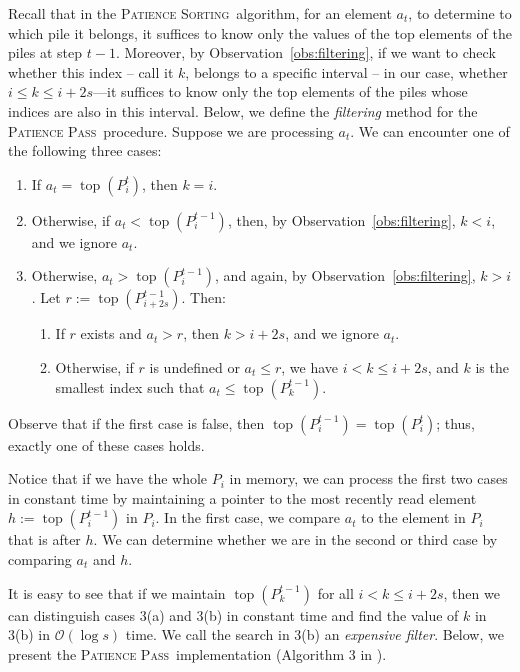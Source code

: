 \documentclass[lic, english, shortabstract]{iithesis}
\theoremstyle{plain}
\newcommand{\Psort}{\textsc{Patience Sorting}}
\newcommand{\Ppass}{\textsc{Patience Pass}}
\theoremstyle{definition}
\begin{document}
Recall that in the \Psort\ algorithm, for an element $a_t$, to determine to which pile it belongs, it suffices to know only the values of the top elements of the piles at step $t-1$. 
Moreover, by Observation~\ref{obs:filtering}, if we want to check whether this index -- call it $k$, belongs to a specific interval -- in our case, whether $i \leq k \leq i + 2s$---it suffices to know only the top elements of the piles whose indices are also in this interval.
Below, we define the \textit{filtering} method for the \Ppass\ procedure.
Suppose we are processing $a_t$. We can encounter one of the following three cases: 
\begin{enumerate}
\item If $a_t = \operatorname{top}(P_i^t)$, then $k = i$.
\item Otherwise, if $a_t < \operatorname{top}(P_i^{t-1})$, then, by Observation~\ref{obs:filtering}, $k < i$, and we ignore $a_t$.
\item Otherwise, $a_t > \operatorname{top}(P_i^{t-1})$, and again, by Observation~\ref{obs:filtering}, $k > i$.
Let $r := \operatorname{top}(P_{i + 2s}^{t-1})$. Then:
    \begin{enumerate}
    \item If $r$ exists and $a_t > r$, then $k > i + 2s$, and we ignore $a_t$.
    \item Otherwise, if $r$ is undefined or $a_t \leq r$, we have $i < k \leq i + 2s$, and $k$ is the smallest index such that $a_t \leq \operatorname{top}(P_k^{t-1})$.
    \end{enumerate}
\end{enumerate}
Observe that if the first case is false, then $\operatorname{top}(P_i^{t-1}) = \operatorname{top}(P_i^{t})$; thus, exactly one of these cases holds.

Notice that if we have the whole $P_i$ in memory, we can process the first two cases in constant time by maintaining a pointer to the most recently read element $h := \operatorname{top}(P_i^{t-1})$ in $P_i$.
In the first case, we compare $a_t$ to the element in $P_i$ that is after $h$. We can determine whether we are in the second or third case by comparing $a_t$ and $h$.

It is easy to see that if we maintain $\operatorname{top}(P_k^{t-1})$ for all $i < k \leq i + 2s$, then we can distinguish cases 3(a) and 3(b) in constant time and find the value of $k$ in 3(b) in $\mathcal{O}(\log s)$ time.
We call the search in 3(b) an \textit{expensive filter}. Below, we present the \Ppass\ implementation (Algorithm 3 in \cite{kiyomi2017space}).
\end{document}
